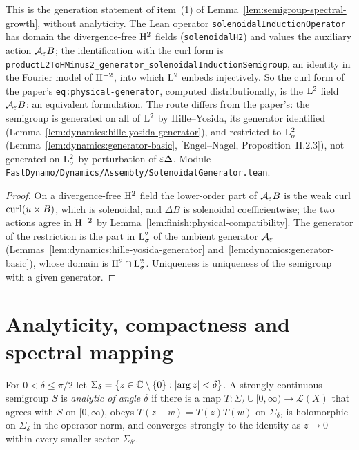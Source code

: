 This is the generation statement of item~(1) of Lemma~\ref{lem:semigroup-spectral-growth},
without analyticity.  The Lean operator \texttt{solenoidalInductionOperator} has domain the
divergence-free $\mathrm{H}^2$ fields (\texttt{solenoidalH2}) and values the auxiliary action
$\mathcal A_\varepsilon B$; the identification with the curl form is
\texttt{productL2ToHMinus2\_generator\_solenoidalInductionSemigroup}, an identity in the Fourier
model of $\mathrm{H}^{-2}$, into which $\mathrm{L}^2$ embeds injectively.  So the curl form of the paper's
\texttt{eq:physical-generator}, computed distributionally, is the $\mathrm{L}^2$ field
$\mathcal A_\varepsilon B$: an equivalent formulation.  The route differs from the paper's: the
semigroup is generated on all of $\mathrm{L}^2$ by Hille--Yosida, its generator identified
(Lemma~\ref{lem:dynamics:hille-yosida-generator}), and restricted to $\mathrm{L}^2_\sigma$
(Lemma~\ref{lem:dynamics:generator-basic}, [Engel--Nagel, Proposition~II.2.3]), not generated
on $\mathrm{L}^2_\sigma$ by perturbation of $\varepsilon\Delta$.  Module
\texttt{FastDynamo/Dynamics/Assembly/SolenoidalGenerator.lean}.

\begin{proof}
  \leanok
  On a divergence-free $\mathrm{H}^2$ field the lower-order part of $\mathcal A_\varepsilon B$ is the weak
  curl $\operatorname{curl}(u\times B)$, which is solenoidal, and $\Delta B$ is solenoidal coefficientwise;
  the two actions agree in $\mathrm{H}^{-2}$ by Lemma~\ref{lem:finish:physical-compatibility}.  The
  generator of the restriction is the part in $\mathrm{L}^2_\sigma$ of the ambient generator
  $\mathcal A_\varepsilon$ (Lemmas~\ref{lem:dynamics:hille-yosida-generator}
  and~\ref{lem:dynamics:generator-basic}), whose domain is
  $\mathrm{H}^2\cap\mathrm{L}^2_\sigma$.  Uniqueness is uniqueness of the semigroup with a given generator.
\end{proof}

\section{Analyticity, compactness and spectral mapping}
\label{sec:dynamics:analytic}

\begin{definition}
  \label{def:dynamics:analytic-semigroup}
  \leanok
  For $0<\delta\leq\pi/2$ let $\Sigma_\delta=\{z\in\mathbb{C}\setminus\{0\}:\left\lvert\arg z\right\rvert<\delta\}$.  A
  strongly continuous semigroup $S$ is \emph{analytic of angle $\delta$} if there is a map
  $T:\Sigma_\delta\cup[0,\infty)\to\mathcal L(X)$ that agrees with $S$ on $[0,\infty)$, obeys
  $T(z+w)=T(z)T(w)$ on $\Sigma_\delta$, is holomorphic on $\Sigma_\delta$ in the operator norm,
  and converges strongly to the identity as $z\to0$ within every smaller sector
  $\Sigma_{\delta'}$.
\end{definition}


